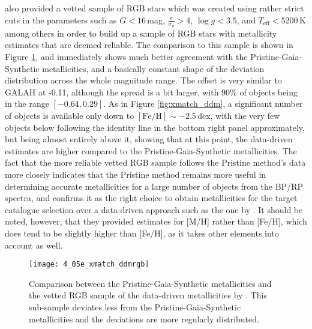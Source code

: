 \documentclass[a4paper,11pt]{article}
\begin{document}
%
\citet{andrae23} also provided a vetted sample of RGB stars which was created using rather strict cuts in the parameters such as $G<16$\,mag, $\frac{\pi}{\sigma_\pi}>4$, $\log{g}<3.5$, and $T_\mathrm{eff}<5200$\,K among others in order to build up a sample of RGB stars with metallicity estimates that are deemed reliable. The comparison to this sample is shown in Figure \ref{fig:xmatch_ddmrgb}, and immediately shows much better agreement with the Pristine-Gaia-Synthetic metallicities, and a basically constant shape of the deviation distribution across the whole magnitude range. The offset is very similar to GALAH at -0.11, although the spread is a bit larger, with 90\% of objects being in the range $[-0.64,0.29]$. As in Figure \ref{fig:xmatch_ddm}, a significant number of objects is available only down to $\mathrm{[Fe/H]}\sim-2.5$\,dex, with the very few objects below following the identity line in the bottom right panel approximately, but being almost entirely above it, showing that at this point, the data-driven estimates are higher compared to the Pristine-Gaia-Synthetic metallicities. The fact that the more reliable vetted RGB sample follows the Pristine method's data more closely indicates that the Pristine method remains more useful in determining accurate metallicities for a large number of objects from the BP/RP spectra, and confirms it as the right choice to obtain metallicities for the target catalogue selection over a data-driven approach such as the one by \citep{andrae23}. It should be noted, however, that they provided estimates for [M/H] rather than [Fe/H], which does tend to be slightly higher than [Fe/H], as it takes other elements into account as well.
%
\begin{figure}
 \centering
 \texttt{[image: 4\_05e\_xmatch\_ddmrgb]}
 \caption[Metallicity comparison to data-driven metallicities, RGB sample]{Comparison between the Pristine-Gaia-Synthetic metallicities and the vetted RGB sample of the data-driven metallicities by \citet{andrae23}. This sub-sample deviates less from the Pristine-Gaia-Synthetic metallicities and the deviations are more regularly distributed.}
 \label{fig:xmatch_ddmrgb}
\end{figure}
%
\end{document}
